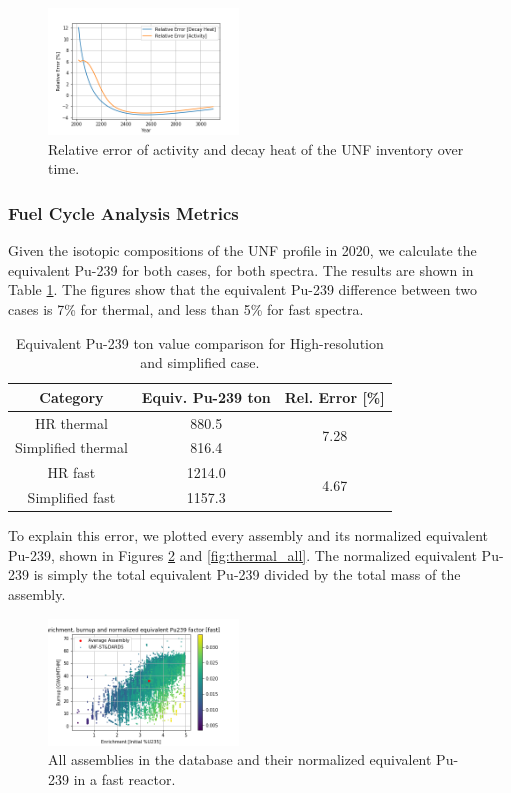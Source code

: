 \documentclass{anstrans}
\begin{document}
\begin{figure}
    \centering
    \includegraphics[width=0.45\textwidth]{./images/ha_err.png}
    \caption{Relative error of activity and decay heat of the
            \gls{UNF} inventory over time.}
    \label{fig:wm_err}
\end{figure}



\subsubsection{Fuel Cycle Analysis Metrics}
Given the isotopic compositions of the \gls{UNF} profile in 2020,
we calculate the equivalent Pu-239 for both cases, for
both spectra. The results are shown in Table \ref{tab:equiv}.
The figures show that the equivalent
Pu-239 difference between two cases is 7\% for thermal,
and less than 5\% for fast spectra.

\begin{table}[h]
    \centering
    \begin{tabular}{ccc}
        \hline
        Category & Equiv. Pu-239 ton & Rel. Error [\%] \\
        \hline
        HR thermal & 880.5 & \multirow{2}{*}{7.28}\\
        Simplified thermal & 816.4\\
        \hline
        HR fast & 1214.0 & \multirow{2}{*}{4.67}\\
        Simplified fast & 1157.3 &\\
        \hline
    \end{tabular}
    \caption{Equivalent Pu-239 ton value comparison for High-resolution and simplified case.}
    \label{tab:equiv}
\end{table}

To explain this error, we plotted every assembly and its
normalized equivalent Pu-239, shown in Figures \ref{fig:fast_all} and \ref{fig:thermal_all}.
The normalized equivalent Pu-239 is simply the 
total equivalent Pu-239 divided by the total mass
of the assembly.

\begin{figure}
    \centering
    \includegraphics[width=0.45\textwidth]{./images/fast_all.png}
    \caption{All assemblies in the database and their normalized equivalent Pu-239 in a fast reactor.}
    \label{fig:fast_all}
\end{figure}
\end{document}

